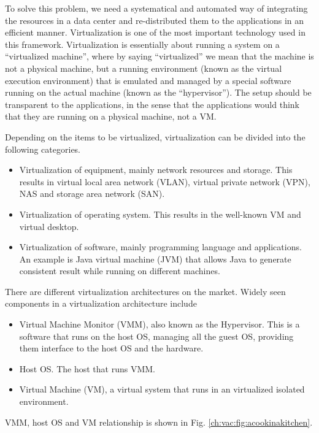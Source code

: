To solve this problem, we need a systematical and automated way of integrating the resources in a data center and re-distributed them to the applications in an efficient manner. Virtualization is one of the most important technology used in this framework. Virtualization is essentially about running a system on a ``virtualized machine'', where by saying ``virtualized'' we mean that the machine is not a physical machine, but a running environment (known as the virtual execution environment) that is emulated and managed by a special software running on the actual machine (known as the ``hypervisor''). The setup should be transparent to the applications, in the sense that the applications would think that they are running on a physical machine, not a VM.

Depending on the items to be virtualized, virtualization can be divided into the following categories.
\begin{itemize}
  \item Virtualization of equipment, mainly network resources and storage. This results in virtual local area network (VLAN), virtual private network (VPN), NAS and storage area network (SAN).
  \item Virtualization of operating system. This results in the well-known VM and virtual desktop.
  \item Virtualization of software, mainly programming language and applications. An example is Java virtual machine (JVM) that allows Java to generate consistent result while running on different machines.
\end{itemize}

There are different virtualization architectures on the market. Widely seen components in a virtualization architecture include
\begin{itemize}
	\item Virtual Machine Monitor (VMM), also known as the Hypervisor. This is a software that runs on the host OS, managing all the guest OS, providing them interface to the host OS and the hardware.
	\item Host OS. The host that runs VMM.
	\item Virtual Machine (VM), a virtual system that runs in an virtualized isolated environment.
\end{itemize}
VMM, host OS and VM relationship is shown in Fig. \ref{ch:vac:fig:acookinakitchen}. 

